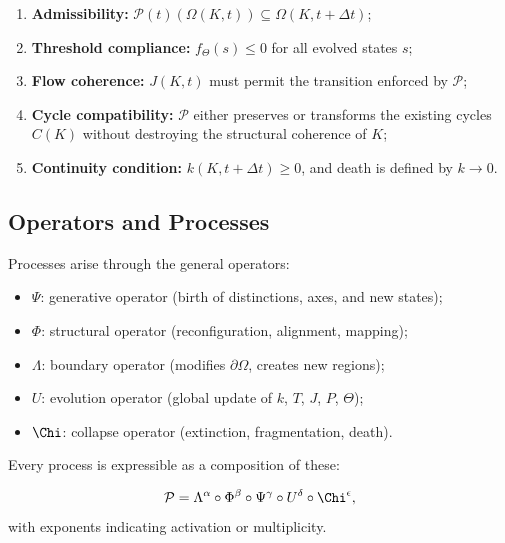 \begin{enumerate}
    \item \textbf{Admissibility:} 
    $\mathcal{P}(t)(\Omega(K,t)) \subseteq \Omega(K,t+\Delta t)$;

    \item \textbf{Threshold compliance:}
    $f_{\Theta}(s) \le 0$ for all evolved states $s$;

    \item \textbf{Flow coherence:}
    $J(K,t)$ must permit the transition enforced by $\mathcal{P}$;

    \item \textbf{Cycle compatibility:}
    $\mathcal{P}$ either preserves or transforms the existing cycles $C(K)$
    without destroying the structural coherence of $K$;

    \item \textbf{Continuity condition:}
    $k(K,t+\Delta t) \ge 0$, and death is defined by $k \to 0$.
\end{enumerate}

\subsection{Operators and Processes}

Processes arise through the general operators:

\begin{itemize}
    \item $\Psi$: generative operator (birth of distinctions, axes, and new states);
    \item $\Phi$: structural operator (reconfiguration, alignment, mapping);
    \item $\Lambda$: boundary operator (modifies $\partial\Omega$, creates new regions);
    \item $U$: evolution operator (global update of $k$, $T$, $J$, $P$, $\Theta$);
    \item $\Chi$: collapse operator (extinction, fragmentation, death).
\end{itemize}

Every process is expressible as a composition of these:

\[
\mathcal{P} = 
\Lambda^{\alpha} \circ \Phi^{\beta} \circ \Psi^{\gamma} 
\circ U^{\delta} \circ \Chi^{\epsilon},
\]
with exponents indicating activation or multiplicity.

